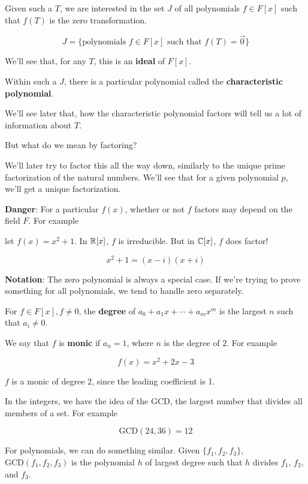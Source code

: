 \documentclass[12pt]{article}
\newcommand{\GCD}{\text{GCD}}
\begin{document}
  Given such a $T$, we are interested in the set $J$ of all polynomials $f \in F[x]$
  such that $f(T)$ is the zero transformation.

  \[
    J = \Big\{ \text{polynomials } f \in F[x] \text{ such that } f(T) = \vec{0} \Big\}
  \]

  We'll see that, for any $T$, this is an {\bf ideal} of $F[x]$.

  Within such a $J$, there is a particular polynomial called the {\bf
  characteristic polynomial}.

  We'll see later that, how the characteristic polynomial factors will tell us a
  lot of information about $T$.

  But what do we mean by factoring?


  We'll later try to factor this all the way down, similarly to the unique prime
  factorization of the natural numbers. We'll see that for a given polynomial
  $p$, we'll get a unique factorization.

  {\bf Danger}: For a particular $f(x)$, whether or not $f$ factors may depend
  on the field $F$. For example

  let $f(x) = x^2 + 1$. In ${\mathbb R}[x]$, $f$ is irreducible. But in ${\mathbb C}[x]$, $f$ does
  factor!

  \[
    x^2 + 1 = (x - i)(x + i)
  \]

  {\bf Notation}: The zero polynomial is always a special case. If we're trying
  to prove something for all polynomials, we tend to handle zero separately.

  For $f \in F[x], f \ne 0$, the {\bf degree} of $a_0 + a_1 x + \cdots + a_m
  x^m$ is the largest $n$ such that $a_i \ne 0$.

  We say that $f$ is {\bf monic} if $a_n = 1$, where $n$ is the degree of $2$.
  For example

  \[
    f(x) = x^2 + 2x - 3
  \]

  $f$ is a monic of degree 2, since the leading coefficient is 1.

  In the integers, we have the idea of the GCD, the largest number that divides
  all members of a set. For example

  \[
    \GCD(24, 36) = 12
  \]

  For polynomials, we can do something similar. Given $\{f_1, f_2, f_3\}$,
  $\GCD(f_1, f_2, f_3)$ is the polynomial $h$ of largest degree such that
  $h$ divides $f_1$, $f_2$, and $f_3$.
\end{document}
